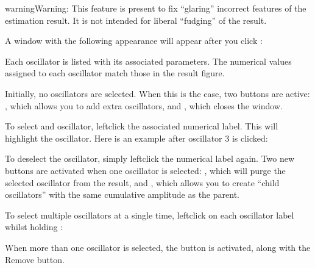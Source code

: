 \documentclass[letterpaper,10pt,english]{sphinxmanual}
\begin{document}
\begin{sphinxadmonition}{warning}{Warning:}
\sphinxAtStartPar
This feature is present to fix “glaring” incorrect features of the estimation
result. It is not intended for liberal “fudging” of the result.
\end{sphinxadmonition}

\sphinxAtStartPar
A window with the following appearance will appear after you click
:


\sphinxAtStartPar
Each oscillator is listed with its associated parameters. The numerical values
assigned to each oscillator match those in the result figure.

\sphinxAtStartPar
Initially, no oscillators are selected. When this is the case, two buttons
are active: , which allows you to add extra oscillators, and ,
which closes the window.

\sphinxAtStartPar
To select and oscillator, left\sphinxhyphen{}click the associated numerical label. This will
highlight the oscillator. Here is an example after oscillator 3 is clicked:


\sphinxAtStartPar
To de\sphinxhyphen{}select the oscillator, simply left\sphinxhyphen{}click the numerical label again. Two
new buttons are activated when one oscillator is selected: , which will
purge the selected oscillator from the result, and , which allows you
to create “child oscillators” with the same cumulative amplitude as the parent.

\sphinxAtStartPar
To select multiple oscillators at a single time, left\sphinxhyphen{}click on each oscillator
label whilst holding :


\sphinxAtStartPar
When more than one oscillator is selected, the  button is activated,
along with the Remove button.
\end{document}
